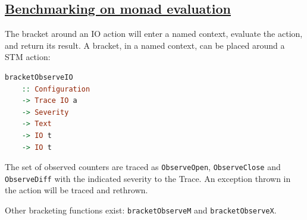 

\pagecolor{columbiablue!50}




\begin{mdframed}
    \section*{\href{https://github.com/input-output-hk/iohk-monitoring-framework/blob/master/iohk-monitoring/src/Cardano/BM/Observer/Monadic.lhs}{Benchmarking on monad evaluation}}

The bracket around an IO action will enter a named context, evaluate the action, and return its result. A bracket, in a named context, can be placed around a STM action:

    \begin{lstlisting}[language=Haskell]
bracketObserveIO
    :: Configuration
    -> Trace IO a
    -> Severity
    -> Text
    -> IO t
    -> IO t
    \end{lstlisting}

The set of observed counters are traced as \texttt{ObserveOpen}, \texttt{ObserveClose} and \texttt{ObserveDiff} with the indicated severity to the Trace. An exception thrown in the action will be traced and rethrown.

Other bracketing functions exist: \texttt{bracketObserveM} and \texttt{bracketObserveX}.
\end{mdframed}

